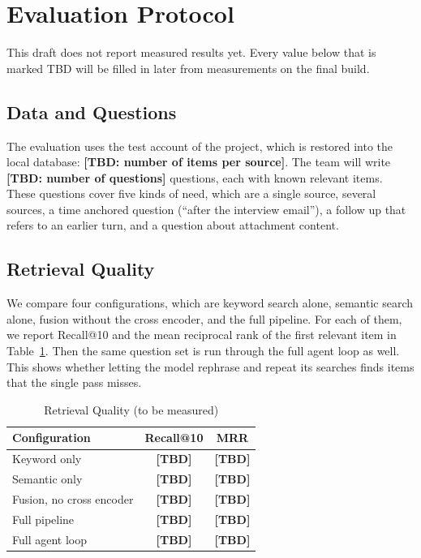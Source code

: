\documentclass[conference]{IEEEtran}
\newcommand{\tbd}[1]{\textbf{[TBD: #1]}}
\begin{document}
\section{Evaluation Protocol}\label{sec:eval}
This draft does not report measured results yet. Every value below that is marked TBD will be filled in later from measurements on the final build.

\subsection{Data and Questions}
The evaluation uses the test account of the project, which is restored into the local database: \tbd{number of items per source}. The team will write \tbd{number of questions} questions, each with known relevant items. These questions cover five kinds of need, which are a single source, several sources, a time anchored question (``after the interview email''), a follow up that refers to an earlier turn, and a question about attachment content.

\subsection{Retrieval Quality}
We compare four configurations, which are keyword search alone, semantic search alone, fusion without the cross encoder, and the full pipeline. For each of them, we report Recall@10 and the mean reciprocal rank of the first relevant item in Table~\ref{tab:results}. Then the same question set is run through the full agent loop as well. This shows whether letting the model rephrase and repeat its searches finds items that the single pass misses.

\begin{table}[t]
\caption{Retrieval Quality (to be measured)}
\label{tab:results}
\centering
\renewcommand{\arraystretch}{1.15}
\begin{tabular}{|l|c|c|}
\hline
\textbf{Configuration} & \textbf{Recall@10} & \textbf{MRR} \\
\hline
Keyword only & \textbf{[TBD]} & \textbf{[TBD]} \\
\hline
Semantic only & \textbf{[TBD]} & \textbf{[TBD]} \\
\hline
Fusion, no cross encoder & \textbf{[TBD]} & \textbf{[TBD]} \\
\hline
Full pipeline & \textbf{[TBD]} & \textbf{[TBD]} \\
\hline
Full agent loop & \textbf{[TBD]} & \textbf{[TBD]} \\
\hline
\end{tabular}
\end{table}
\end{document}
